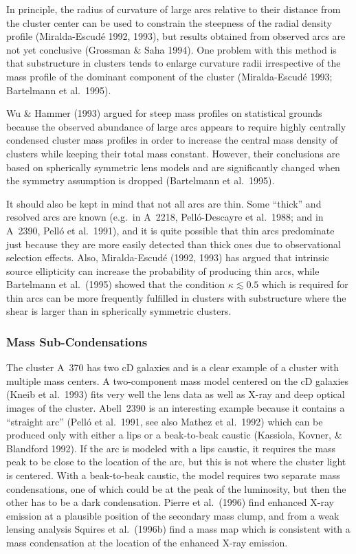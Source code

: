\documentclass[a4paper,10pt]{article} %
\newcommand{\la}{\lesssim}
\begin{document}
In principle, the radius of curvature of large arcs relative to their
distance from the cluster center can be used to constrain the
steepness of the radial density profile (Miralda-Escud\'e 1992, 1993),
but results obtained from observed arcs are not yet conclusive
(Grossman \& Saha 1994). One problem with this method is that
substructure in clusters tends to enlarge curvature radii irrespective
of the mass profile of the dominant component of the cluster
(Miralda-Escud\'e 1993; Bartelmann et al.\ 1995).

Wu \& Hammer (1993) argued for steep mass profiles on statistical
grounds because the observed abundance of large arcs appears to
require highly centrally condensed cluster mass profiles in order to
increase the central mass density of clusters while keeping their
total mass constant. However, their conclusions are based on
spherically symmetric lens models and are significantly changed when
the symmetry assumption is dropped (Bartelmann et al.\ 1995).

It should also be kept in mind that not all arcs are thin. Some
``thick'' and resolved arcs are known (e.g.\ in A~2218,
Pell\'o-Descayre et al.\ 1988; and in A~2390, Pell\'o et al.\ 1991),
and it is quite possible that thin arcs predominate just because they
are more easily detected than thick ones due to observational
selection effects. Also, Miralda-Escud\'e (1992, 1993) has argued that
intrinsic source ellipticity can increase the probability of producing
thin arcs, while Bartelmann et al.\ (1995) showed that the condition
$\kappa\la0.5$ which is required for thin arcs can be more frequently
fulfilled in clusters with substructure where the shear is larger than
in spherically symmetric clusters.

\subsubsection{Mass Sub-Condensations}
\label{NB:subsubsect4.1.6}

The cluster A~370 has two cD galaxies and is a clear example of a
cluster with multiple mass centers. A two-component mass model
centered on the cD galaxies (Kneib et al.\ 1993) fits very well the
lens data as well as X-ray and deep optical images of the
cluster. Abell~2390 is an interesting example because it contains a
``straight arc'' (Pell\'o et al.\ 1991, see also Mathez et al.\ 1992)
which can be produced only with either a lips or a beak-to-beak
caustic (Kassiola, Kovner, \& Blandford 1992). If the arc is modeled
with a lips caustic, it requires the mass peak to be close to the
location of the arc, but this is not where the cluster light is
centered. With a beak-to-beak caustic, the model requires two separate
mass condensations, one of which could be at the peak of the
luminosity, but then the other has to be a dark condensation. Pierre
et al.\ (1996) find enhanced X-ray emission at a plausible position of
the secondary mass clump, and from a weak lensing analysis Squires et
al.\ (1996b) find a mass map which is consistent with a mass
condensation at the location of the enhanced X-ray emission.
\end{document}
